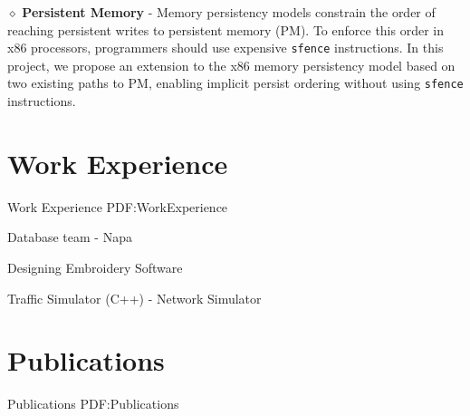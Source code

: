 \documentclass[a4paper,9pt,oneside]{article}
\begin{document}
\begin{body}
{\newline
$\diamond$
\textbf{Persistent Memory} -
Memory persistency models constrain the order of reaching persistent writes to persistent memory (PM). To enforce this order in x86 processors, programmers should use expensive \texttt{sfence} instructions. In this project, we propose an extension to the x86 memory persistency model based on two existing paths to PM, enabling implicit persist ordering without using \texttt{sfence} instructions.
}
\newline
{}


\section
{Work\newline
Experience}
{Work Experience}
{PDF:WorkExperience}


\GapNoBreak
\SubBulletItem
Database team - Napa


\GapNoBreak
\SubBulletItem
Designing Embroidery Software



\GapNoBreak
\SubBulletItem
Traffic Simulator (C++) - Network Simulator




\section
{Publications}
{Publications}
{PDF:Publications}


\end{body}
\end{document}
